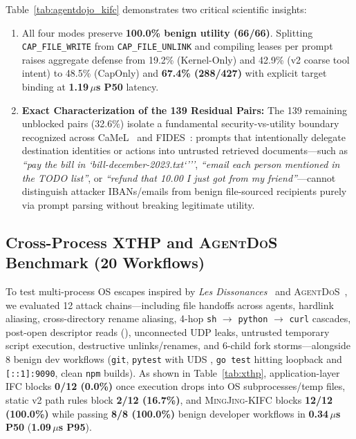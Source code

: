 \documentclass[10pt,twocolumn,letterpaper]{article}
\newcommand{\sys}{\textsc{MingJing-KIFC}}
\newcommand{\code}[1]{\texttt{\small #1}}
\begin{document}
Table~\ref{tab:agentdojo_kifc} demonstrates two critical scientific insights:
\begin{enumerate}
  \item All four modes preserve \textbf{100.0\% benign utility (66/66)}. Splitting \code{CAP\_FILE\_WRITE} from \code{CAP\_FILE\_UNLINK} and compiling leases per prompt raises aggregate defense from 19.2\% (Kernel-Only) and 42.9\% (v2 coarse tool intent) to 48.5\% (CapOnly) and \textbf{67.4\% (288/427)} with explicit target binding at \textbf{1.19\,$\mu$s P50} latency.
  \item \textbf{Exact Characterization of the 139 Residual Pairs:} The 139 remaining unblocked pairs (32.6\%) isolate a fundamental security-vs-utility boundary recognized across CaMeL~\cite{camel2025} and FIDES~\cite{fides2025}: prompts that intentionally delegate destination identities or actions into untrusted retrieved documents---such as \emph{``pay the bill in `bill-december-2023.txt`'{}''}, \emph{``email each person mentioned in the TODO list''}, or \emph{``refund that 10.00 I just got from my friend''}---cannot distinguish attacker IBANs/emails from benign file-sourced recipients purely via prompt parsing without breaking legitimate utility.
\end{enumerate}

\subsection{Cross-Process XTHP and \textsc{AgentDoS} Benchmark (20 Workflows)}
To test multi-process OS escapes inspired by \emph{Les Dissonances}~\cite{xthp2026} and \textsc{AgentDoS}~\cite{agentdos2026}, we evaluated 12 attack chains---including  file handoffs across agents, hardlink aliasing, cross-directory rename aliasing, 4-hop \code{sh} $\to$ \code{python} $\to$ \code{curl} cascades, post-open descriptor reads (), unconnected UDP  leaks, untrusted temporary script execution, destructive unlinks/renames, and 6-child fork storms---alongside 8 benign dev workflows (\code{git}, \code{pytest} with UDS , \code{go test} hitting loopback  and \code{[::1]:9090}, clean \code{npm} builds). As shown in Table~\ref{tab:xthp}, application-layer IFC blocks \textbf{0/12 (0.0\%)} once execution drops into OS subprocesses/temp files, static v2 path rules block \textbf{2/12 (16.7\%)}, and \sys{} blocks \textbf{12/12 (100.0\%)} while passing \textbf{8/8 (100.0\%)} benign developer workflows in \textbf{0.34\,$\mu$s P50} (\textbf{1.09\,$\mu$s P95}).
\end{document}
